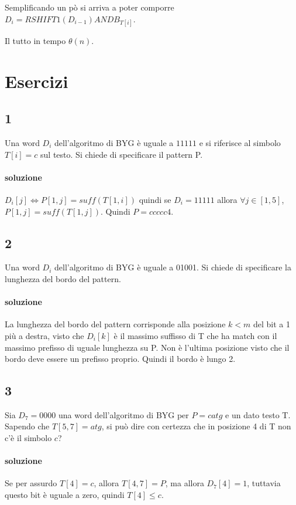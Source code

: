 Semplificando un p\`o si arriva a poter comporre $D_i = RSHIFT1(D_{i-1}) AND B_{T[i]}$.

Il tutto in tempo $\theta(n)$.

\section{Esercizi}

\subsection{1}

Una word $D_i$ dell'algoritmo di BYG è uguale a $11111$ e si riferisce al simbolo $T[i]=c$ sul testo. Si chiede di specificare il pattern P.

\paragraph{soluzione} $D_i[j] \Leftrightarrow P[1,j] = suff(T[1,i])$ quindi se $D_i = 11111$ allora $\forall j \in [1,5]$, $P[1,j] = suff(T[1,j])$. Quindi $P = ccccc4$.

\subsection{2}

Una word $D_i$ dell'algoritmo di BYG \`e uguale a 01001. Si chiede di specificare la lunghezza del bordo del pattern.

\paragraph{soluzione} La lunghezza del bordo del pattern corrisponde alla posizione $k < m$ del bit a 1 pi\`u a destra, visto che $D_i[k]$ \`e il massimo suffisso di T che ha match con il massimo prefisso di uguale lunghezza su P. Non \`e l'ultima posizione visto che il bordo deve essere un prefisso proprio. Quindi il bordo \`e lungo 2.

\subsection{3}

Sia $D_7 = 0000$ una word dell’algoritmo di BYG per $P=catg$ e un dato testo T. Sapendo che $T[5,7] = atg$, si pu\`o dire con certezza che in posizione 4 di T non c'\`e il simbolo $c$?

\paragraph{soluzione} Se per assurdo $T[4] = c$, allora $T[4,7] = P$, ma allora $D_7[4] = 1$, tuttavia questo bit \`e uguale a zero, quindi $T[4] \leq c$.

